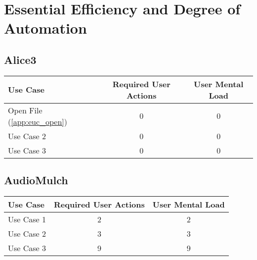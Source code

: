\section{Essential Efficiency and Degree of Automation}

\subsection*{Alice3}

\begin{tabularx}{\textwidth}{Xcc}
\textbf{Use Case} & \textbf{Required User Actions} & \textbf{User Mental Load}\\
\hline
Open File (\ref{app:euc_open}) & 0 & 0 \\
Use Case 2                     & 0 & 0 \\
Use Case 3                     & 0 & 0
\end{tabularx}

\subsection*{AudioMulch}




\begin{tabularx}{\textwidth}{Xcc}
\textbf{Use Case} & \textbf{Required User Actions} & \textbf{User Mental Load}\\
\hline
Use Case 1                          & 2 & 2 \\
Use Case 2                          & 3 & 3 \\
Use Case 3                          & 9 & 9
\end{tabularx}


